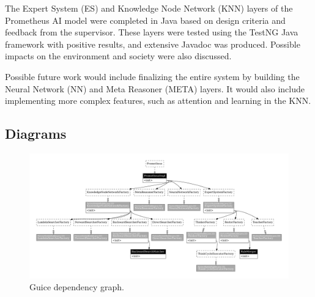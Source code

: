 \documentclass[titlepage,11pt]{article}
\begin{document}
The Expert System (ES) and Knowledge Node Network (KNN) layers of the Prometheus AI model were completed in Java based on design criteria and feedback from the supervisor. These layers were tested using the TestNG Java framework with positive results, and extensive Javadoc was produced. Possible impacts on the environment and society were also discussed.

Possible future work would include finalizing the entire system by building the Neural Network (NN) and Meta Reasoner (META) layers. It would also include implementing more complex features, such as attention and learning in the KNN.

\clearpage
\onecolumn

{}


\appendix
\renewcommand\thefigure{\thesection.\arabic{figure}}
\setcounter{figure}{0}

\begin{landscape}    
	\section{Diagrams}
	\label{sec:diagrams}
	\begin{figure}[!htb]
		\includegraphics[width=\columnwidth]{figures/guice_graph.pdf}
		\caption{Guice dependency graph.}
		\label{fig:guice_graph}
	\end{figure}
\clearpage
\end{landscape}
\end{document}
